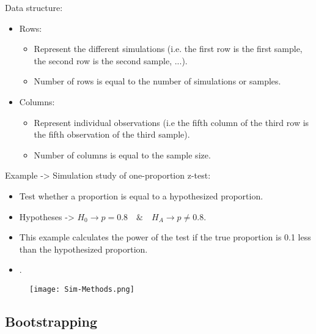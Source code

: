\documentclass[11pt, oneside]{article}
\begin{document}
Data structure:
\begin{itemize}
\item Rows:
	\begin{itemize}
	\item Represent the different simulations (i.e. the first row is the first sample, the second row is the second sample, ...).
	\item Number of rows is equal to the number of simulations or samples.
	\end{itemize}
\item Columns:
	\begin{itemize}
	\item Represent individual observations (i.e the fifth column of the third row is the fifth observation of the third sample).
	\item Number of columns is equal to the sample size.
	\end{itemize}
\end{itemize}

Example -> Simulation study of one-proportion z-test:
\begin{itemize}
\item Test whether a proportion is equal to a hypothesized proportion.
\item Hypotheses -> $H_0\rightarrow p=0.8\quad\&\quad H_A\rightarrow p\ne0.8$.
\item This example calculates the power of the test if the true proportion is 0.1 less than the hypothesized proportion.
\item < test statistic distribution, p-value calculation formula and decision rule >.
\end{itemize}

\begin{figure}[H]
\texttt{[image: Sim-Methods.png]}
\end{figure}

\subsection{Bootstrapping}
\end{document}
